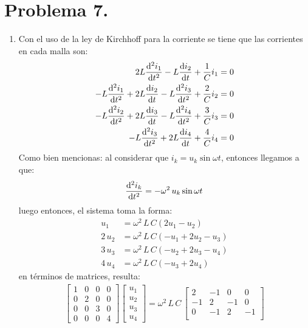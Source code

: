 \section{Problema 7.}

\begin{enumerate}
\item Con el uso de la ley de Kirchhoff para la corriente se tiene que las corrientes en cada malla son:
\begin{align*}
2 L \dv[2]{i_{1}}{t} - L \dv{i_{2}}{t} + \dfrac{1}{C} i_{1} &= 0 \\
- L \dv[2]{i_{1}}{t} + 2 L \dv{i_{2}}{t} - L \dv[2]{i_{3}}{t} +  \dfrac{2}{C} i_{2} &= 0 \\
- L \dv[2]{i_{2}}{t} + 2 L \dv{i_{3}}{t} - L \dv[2]{i_{4}}{t} +  \dfrac{3}{C} i_{3} &= 0 \\
- L \dv[2]{i_{3}}{t} + 2 L \dv{i_{4}}{t} +  \dfrac{4}{C} i_{4} &= 0
\end{align*}
Como bien mencionas: al considerar que $i_{k} = u_{k} \sin \omega t$, entonces llegamos a que:
\begin{align*}
\dv[2]{i_{k}}{t} = - \omega^{2} \, u_{k} \sin \omega t
\end{align*}
luego entonces, el sistema toma la forma:
\begin{align*}
u_{1} &= \omega^{2} \, L \, C (2 u_{1} - u_{2}) \\
2 \, u_{2} &= \omega^{2} \, L \, C (- u_{1} + 2 u_{2} - u_{3}) \\
3 \, u_{3} &= \omega^{2} \, L \, C (- u_{2} + 2 u_{3} - u_{4}) \\
4 \, u_{4} &= \omega^{2} \, L \, C (- u_{3} + 2 u_{4})
\end{align*}
en términos de matrices, resulta:
\begin{align*}
\begin{bmatrix}
1 & 0 & 0 & 0 \\
0 & 2 & 0 & 0 \\
0 & 0 & 3 & 0 \\
0 & 0 & 0 & 4
\end{bmatrix}
\begin{bmatrix}
u_{1} \\
u_{2} \\
u_{3} \\
u_{4}
\end{bmatrix} = \omega^{2} \, L \, C \,
\begin{bmatrix}
2 & -1 & 0 & 0 \\
-1 & 2 & -1 & 0 \\
0 & -1 & 2 & -1 \\

\end{bmatrix}
\end{align*}
\end{enumerate}
